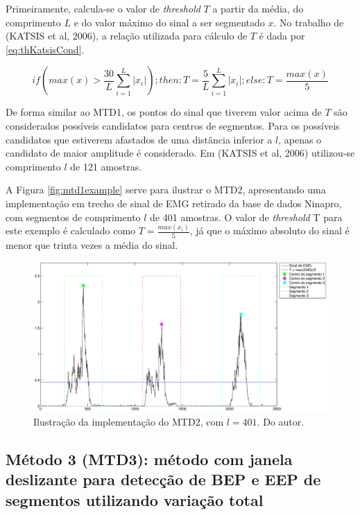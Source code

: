 \documentclass[
	12pt,				%
	openright,			%
	oneside,
	a4paper,			%
	english,			%
	francais,			%
	spanish,			%
	brazil				%
	]{abntex2}
\begin{document}
	Primeiramente, calcula-se o valor de \emph{threshold} $T$ a partir da média, do comprimento $L$ e do valor máximo do sinal a ser segmentado $x$. No trabalho de (KATSIS et al, 2006), a relação utilizada para cálculo de $T$ é dada por \ref{eq:thKatsisCond}.

\begin{equation}
\label{eq:thKatsisCond}
	if\left(max(x) > \frac{30}{L}\sum_{i=1}^{L}|x_i|\right); then: T = \frac{5}{L}\sum_{i=1}^{L}|x_i|; else: T = \frac{max(x)}{5}
\end{equation}

	De forma similar ao MTD1, os pontos do sinal que tiverem valor acima de $T$ são considerados possíveis candidatos para centros de segmentos. Para os possíveis candidatos que estiverem afastados de uma distância inferior a $l$, apenas o candidato de maior amplitude é considerado. Em (KATSIS et al, 2006) utilizou-se comprimento $l$ de 121 amostras.
	
	A Figura \ref{fig:mtd1example} serve para ilustrar o MTD2, apresentando uma implementação em trecho de sinal de EMG retirado da base de dados Ninapro, com segmentos de comprimento $l$ de 401 amostras. O valor de \emph{threshold} T para este exemplo é calculado como $T = \frac{max(x_i)}{5}$, já que o máximo absoluto do sinal é menor que trinta vezes a média do sinal.

\begin{figure}
\centering
\includegraphics[width=\linewidth]{./img/mtd2example.eps}
\caption{Ilustração da implementação do MTD2, com $l = 401$. Do autor.}
\label{fig:mtd2example}
\end{figure}
	
\subsection{Método 3 (MTD3): método com janela deslizante para detecção de BEP e EEP de segmentos utilizando variação total}
\end{document}
